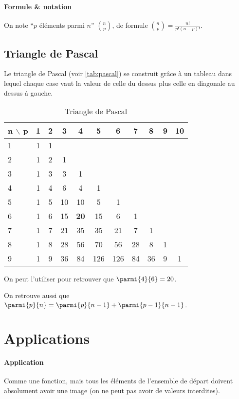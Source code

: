 \documentclass[10pt,a4paper,french]{article}
\begin{document}
\paragraph{Formule \& notation}
On note ``$p$ éléments parmi $n$'' $n \choose p$, de formule ${n \choose p} = \frac{n!}{p! (n-p)!}$.

\subsection{Triangle de Pascal}

Le triangle de Pascal (voir \autoref{tab:pascal}) se construit grâce à un tableau dans lequel chaque case vaut la valeur de celle du dessus plus celle en diagonale au dessus à gauche.

\begin{table}
\caption{\label{tab:pascal} Triangle de Pascal}
\centering
\begin{tabular}{l|cccccccccc}
n $\backslash$ p & 1 & 2 & 3 & 4 & 5 & 6 & 7 & 8 & 9 & 10 \\
\hline
1  & 1 & 1 &   &   &   &   &   &   &   &   \\
2  & 1 & 2 & 1 &   &   &   &   &   &   &   \\
3  & 1 & 3 & 3 & 1 &   &   &   &   &   &   \\
4  & 1 & 4 & 6 & 4 & 1 &   &   &   &   &   \\
5  & 1 & 5 & 10 & 10 & 5 & 1 &   &   &   &   \\
6  & 1 & 6 & 15 & \textbf{20} & 15 & 6 & 1 &   &   &   \\
7  & 1 & 7 & 21 & 35 & 35 & 21 & 7 & 1 &   &   \\
8  & 1 & 8 & 28 & 56 & 70 & 56 & 28 & 8 & 1 &   \\
9 & 1 & 9 & 36 & 84 & 126 & 126 & 84 & 36 & 9 & 1 \\
\end{tabular}
\end{table}

On peut l'utiliser pour retrouver que $\parmi{4}{6}=20$.

On retrouve aussi que $\parmi{p}{n} = \parmi{p}{n-1} + \parmi{p-1}{n-1}$.

\section{Applications}

\paragraph{Application}
Comme une fonction, mais tous les éléments de l'ensemble de départ doivent absolument avoir une image (on ne peut pas avoir de valeurs interdites).
\end{document}
